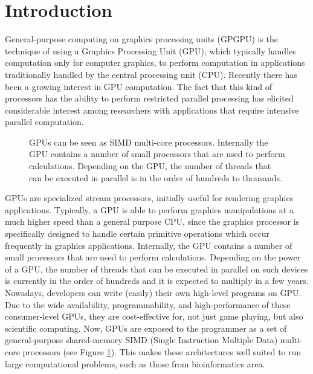 \documentclass[prodmode,acmtecs]{acmsmall}
\begin{document}
\maketitle

\section{Introduction}
\label{sec:intro}

General-purpose computing on graphics processing units (GPGPU) is the technique of using a Graphics Processing Unit (GPU), which typically handles computation only for computer graphics, to perform computation in applications traditionally handled by the central processing unit (CPU). Recently there has been a growing interest in GPU computation. The fact that this kind of processors has the ability to perform restricted parallel processing has elicited considerable interest among researchers with applications that require intensive parallel computation.

\begin{figure}[h]
\centerline{}
\caption{GPUs can be seen as SIMD multi-core processors. Internally the GPU contains a number of small processors that are used to perform calculations. Depending on the GPU, the number of threads that can be executed in parallel is in the order of hundreds to thousands.}
\label{figure:openclfigure2small}
\end{figure}

GPUs are specialized stream processors, initially useful for rendering graphics applications. Typically, a GPU is able to perform graphics manipulations at a much higher speed than a general purpose CPU, since the graphics processor is specifically designed to handle certain primitive operations which occur frequently in graphics applications. Internally, the GPU contains a number of small processors that are used to perform calculations. 
Depending on the power of a GPU, the number of threads that can be executed in parallel on such devices is currently in the order of hundreds and it is expected to multiply in a few years. Nowadays, developers can write (easily) their own high-level programs on GPU. Due to the wide availability, programmability, and high-performance of these consumer-level GPUs, they are cost-effective for, not just game playing, but also scientific computing.
Now, GPUs are exposed to the programmer as a set of general-purpose shared-memory SIMD (Single Instruction Multiple Data) multi-core processors (see Figure \ref{figure:openclfigure2small}). This makes these architectures well suited to run large computational problems, such as those from bioinformatics area. 
\end{document}
